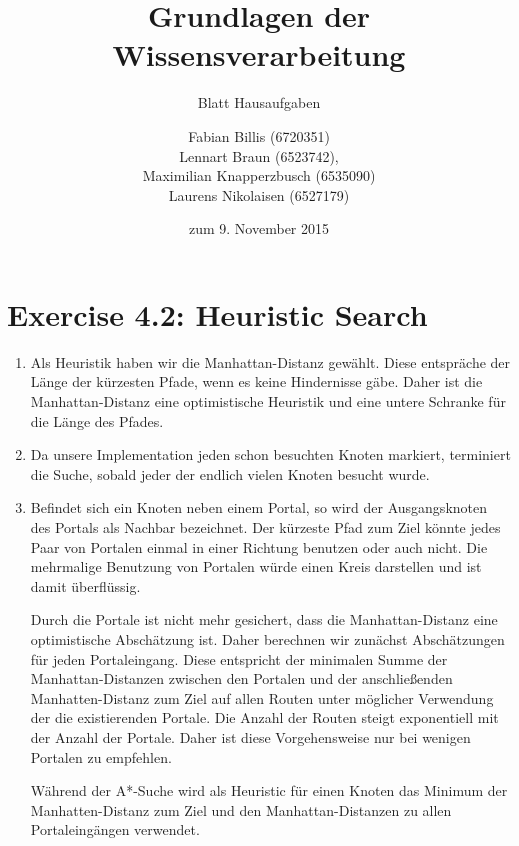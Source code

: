 \documentclass[a4paper]{scrartcl}
\title{Grundlagen der Wissensverarbeitung}
\subtitle{Blatt {\blattnr} Hausaufgaben}
\author{
    Fabian Billis (6720351) \\
    Lennart Braun (6523742), \\
    Maximilian Knapperzbusch (6535090) \\
    Laurens Nikolaisen (6527179) \\
}
\date{zum 9. November 2015}
\def \blattnr {4}
\begin{document}
\maketitle

\section*{Exercise \blattnr.2: Heuristic Search}

\begin{enumerate}
    \item
        Als Heuristik haben wir die Manhattan-Distanz gewählt. Diese entspräche
        der Länge der kürzesten Pfade, wenn es keine Hindernisse gäbe.
        Daher ist die Manhattan-Distanz eine optimistische Heuristik und eine
        untere Schranke für die Länge des Pfades.

    \item
        Da unsere Implementation jeden schon besuchten Knoten markiert,
        terminiert die Suche, sobald jeder der endlich vielen Knoten besucht
        wurde.

    \item
        Befindet sich ein Knoten neben einem Portal, so wird der Ausgangsknoten
        des Portals als Nachbar bezeichnet.
        Der kürzeste Pfad zum Ziel könnte jedes Paar von Portalen einmal in
        einer Richtung benutzen oder auch nicht. Die mehrmalige Benutzung von
        Portalen würde einen Kreis darstellen und ist damit überflüssig.

        Durch die Portale ist nicht mehr gesichert, dass die Manhattan-Distanz
        eine optimistische Abschätzung ist.
        Daher berechnen wir zunächst Abschätzungen für jeden Portaleingang.
        Diese entspricht der minimalen Summe der Manhattan-Distanzen zwischen
        den Portalen und der anschließenden Manhatten-Distanz zum Ziel auf
        allen Routen unter möglicher Verwendung der die existierenden Portale.
        Die Anzahl der Routen steigt exponentiell mit der Anzahl der Portale.
        Daher ist diese Vorgehensweise nur bei wenigen Portalen zu empfehlen.

        Während der A*-Suche wird als Heuristic für einen Knoten das Minimum
        der Manhatten-Distanz zum Ziel und den Manhattan-Distanzen zu allen
        Portaleingängen verwendet.
        


\end{enumerate}
\end{document}
